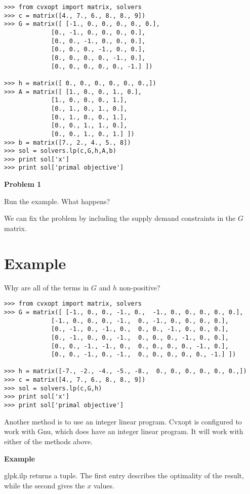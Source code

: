 \begin{lstlisting}
>>> from cvxopt import matrix, solvers
>>> c = matrix([4., 7., 6., 8., 8., 9])
>>> G = matrix([ [-1., 0., 0., 0., 0., 0.],
             [0., -1., 0., 0., 0., 0.],
             [0., 0., -1., 0., 0., 0.],
             [0., 0., 0., -1., 0., 0.],
             [0., 0., 0., 0., -1., 0.],
             [0., 0., 0., 0., 0., -1.] ])
        
>>> h = matrix([ 0., 0., 0., 0., 0., 0.,])
>>> A = matrix([ [1., 0., 0., 1., 0.],
             [1., 0., 0., 0., 1.],
             [0., 1., 0., 1., 0.],
             [0., 1., 0., 0., 1.],
             [0., 0., 1., 1., 0.],
             [0., 0., 1., 0., 1.] ])
>>> b = matrix([7., 2., 4., 5., 8]) 
>>> sol = solvers.lp(c,G,h,A,b)  
>>> print sol['x']
>>> print sol['primal objective']
\end{lstlisting}

\textbf{Problem 1}

Run the example.
What happens?

We can fix the problem by including the supply demand constraints in the $G$ matrix.

\section*{Example}
Why are all of the terms in $G$ and $h$ non-positive?

\begin{lstlisting}
>>> from cvxopt import matrix, solvers
>>> G = matrix([ [-1., 0., 0., -1., 0.,  -1., 0., 0., 0., 0., 0.],
             [-1., 0., 0., 0., -1.,  0., -1., 0., 0., 0., 0.],
             [0., -1., 0., -1., 0.,  0., 0., -1., 0., 0., 0.],
             [0., -1., 0., 0., -1.,  0., 0., 0., -1., 0., 0.],
             [0., 0., -1., -1., 0.,  0., 0., 0., 0., -1., 0.],
             [0., 0., -1., 0., -1.,  0., 0., 0., 0., 0., -1.] ])

>>> h = matrix([-7., -2., -4., -5., -8.,  0., 0., 0., 0., 0., 0.,])
>>> c = matrix([4., 7., 6., 8., 8., 9])
>>> sol = solvers.lp(c,G,h)
>>> print sol['x']
>>> print sol['primal objective']
\end{lstlisting}

Another method is to use an integer linear program.
Cvxopt is configured to work with  Gnu, which does have an integer linear program.
It will work with either of the methods above. 

\textbf{Example}

glpk.ilp returns a tuple.
The first entry describes the optimality of the result, while the second gives the $x$ values.

